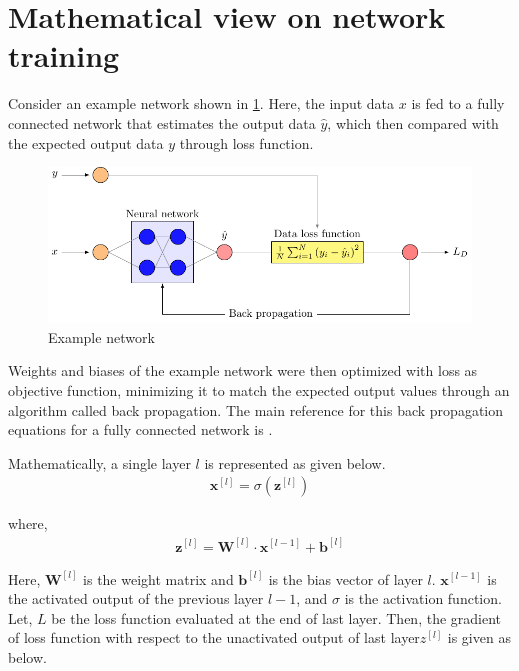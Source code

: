 \section{Mathematical view on network training}
\par{}
Consider an example network shown in \cref{example_network}. Here, the input
data \(x\) is fed to a fully connected network that estimates the output
data \(\hat{y}\), which then compared with the expected output data \(y\) through
loss function.  \\

\begin{figure}
    \center
    \includegraphics[scale=1]{supportingFiles/01_schematics/01_NN_example/NN_example.pdf}
    \caption{Example network}
    \label{example_network}
\end{figure}

\par{}
Weights and biases of the example network were then optimized with loss as
objective function, minimizing it to match the expected output values through
an algorithm called back propagation. The main reference for this back
propagation equations for a fully connected network is
\cite{backpropagation_reference}. \\

\par{}
Mathematically, a single layer \(l\) is represented as given below.
\begin{align*}
    \bm{x}^{[l]} = \sigma\left( \bm{z}^{[l]}\right)
\end{align*}

where,
\begin{align*}
    \bm{z}^{[l]} = \bm{W}^{[l]}\cdot\bm{x}^{[l-1]} + \bm{b}^{[l]}
\end{align*}

Here, \(\bm{W}^{[l]}\) is the weight matrix and \(\bm{b}^{[l]}\) is the bias
vector of layer \(l\).  \(\bm{x}^{[l-1]}\) is the activated output of the
previous layer \(l-1\), and \(\sigma\) is the activation function. Let, \(L\)
be the loss function evaluated at the end of last layer. Then, the gradient of
loss function with respect to the unactivated output of last layer\(z^{[l]}\)
is given as below.

